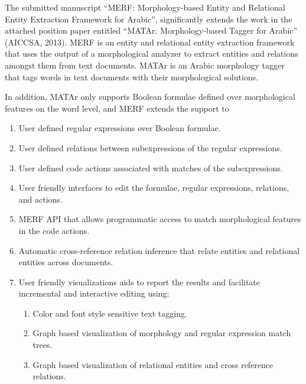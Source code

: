 \documentclass[10pt,stdletter,dateno,sigleft]{newlfm}
\begin{document}
\begin{newlfm}


The submitted manuscript 
``MERF: Morphology-based Entity and Relational Entity Extraction Framework for Arabic'', 
significantly extends the work in the attached position 
paper entitled 
``MATAr: Morphology-based Tagger for Arabic'' (AICCSA, 2013). 
MERF is an entity and relational entity extraction framework that 
uses the output of a morphological analyzer to extract entities and 
relations amongst them from text documents. 
MATAr is an Arabic morphology tagger that tags words in text documents 
with their morphological solutions.

In addition, MATAr only supports Boolean formulae defined over morphological features on the word level, 
and MERF extends the support to 
\begin{enumerate}
\item User defined regular expressions over Boolean formulae.
\item User defined relations between subexpressions of the regular expressions. 
\item User defined code actions associated with matches of the subexpressions. 
\item User friendly interfaces to edit the formulae, regular expressions, relations, and actions. 
\item MERF API that allows programmatic access to match morphological features in the code actions. 
\item Automatic cross-reference relation inference that relate entities and relational entities across documents. 
\item User friendly visualizations aids to report the results and facilitate incremental and interactive editing using:
\begin{enumerate}
\item Color and font style sensitive text tagging. 
\item Graph based visualization of morphology and regular expression match trees.
\item Graph based visualization of relational entities and cross reference relations. 
  \end{enumerate}
\end{enumerate}




\end{newlfm}
\end{document}
